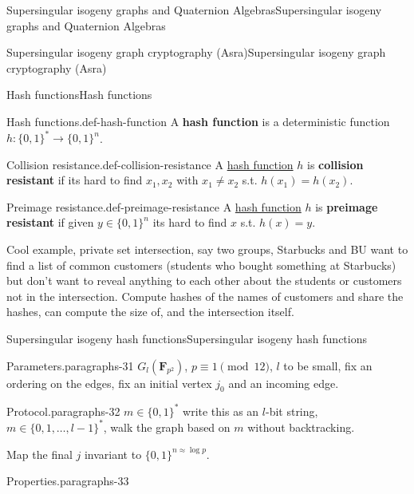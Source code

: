 \documentclass[10pt,]{book}
\newcommand{\terminology}[1]{\textbf{#1}}
\numberwithin{equation}{section}
\newcommand{\FF}{\mathbf{F}}
\begin{document}
\begin{chapterptx}{Supersingular isogeny graphs and Quaternion Algebras}{}{Supersingular isogeny graphs and Quaternion Algebras}{}{}
\begin{sectionptx}{Supersingular isogeny graph cryptography (Asra)}{}{Supersingular isogeny graph cryptography (Asra)}{}{}
\begin{subsectionptx}{Hash functions}{}{Hash functions}{}{}
\begin{definition}{Hash functions.}{def-hash-function}%
\hypertarget{p-830}{}%
A \terminology{hash function} is a deterministic function \(h\colon \{0,1\}^* \to \{0,1\}^n\).%
\end{definition}
\begin{definition}{Collision resistance.}{def-collision-resistance}%
\hypertarget{p-831}{}%
A \hyperref[def-hash-function]{hash function} \(h\) is \terminology{collision resistant} if its hard to find \(x_1,x_2\) with \(x_1\ne x_2 \) s.t. \(h(x_1) = h(x_2)\).%
\end{definition}
\begin{definition}{Preimage resistance.}{def-preimage-resistance}%
\hypertarget{p-832}{}%
A \hyperref[def-hash-function]{hash function} \(h\) is \terminology{preimage resistant} if given \(y\in \{0,1\}^n\) its hard to find \(x\) s.t. \(h(x) = y\).%
\end{definition}
\hypertarget{p-833}{}%
Cool example, private set intersection, say two groups, Starbucks and BU want to find a list of common customers (students who bought something at Starbucks) but don't want to reveal anything to each other about the students or customers not in the intersection. Compute hashes of the names of customers and share the hashes, can compute the size of, and the intersection itself.%
\end{subsectionptx}
%
%
\typeout{************************************************}
\typeout{************************************************}
%
\begin{subsectionptx}{Supersingular isogeny hash functions}{}{Supersingular isogeny hash functions}{}{}\label{subsection-69}
\begin{paragraphs}{Parameters.}{paragraphs-31}%
\hypertarget{p-834}{}%
\(G_l(\FF_{p^2})\), \(p \equiv 1 \pmod{12}\), \(l\) to be small, fix an ordering on the edges, fix an initial vertex \(j_0\) and an incoming edge.%
\end{paragraphs}%
\begin{paragraphs}{Protocol.}{paragraphs-32}%
\hypertarget{p-835}{}%
\(m \in \{0,1\}^*\) write this as an \(l\)-bit string, \(m \in \{0,1,\ldots, l-1\}^*\), walk the graph based on \(m\) without backtracking.%
\par
\hypertarget{p-836}{}%
Map the final \(j\) invariant to  \(\{0,1\}^{n\approx \log p}\).%
\end{paragraphs}%
\begin{paragraphs}{Properties.}{paragraphs-33}%

\end{paragraphs}
\end{subsectionptx}
\end{sectionptx}
\end{chapterptx}
\end{document}
